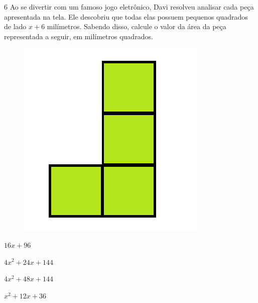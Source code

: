 
\num{6} Ao se divertir com um famoso jogo eletrônico, Davi resolveu analisar
cada peça apresentada na tela. Ele descobriu que todas elas possuem
pequenos quadrados de lado $x + 6$ milímetros. Sabendo disso, calcule o valor da
área da peça representada a seguir, em milímetros quadrados.

\begin{figure}[H]
\centering\includegraphics[width=.3\textwidth]{./imgSAEB_8_MAT/media/image57.png}
\end{figure}

\begin{escolha}
\item $16x + 96$
\item $4x^2 + 24x + 144$
\item $4x^2 + 48x + 144$
\item $x^2 + 12x + 36$
\end{escolha}











